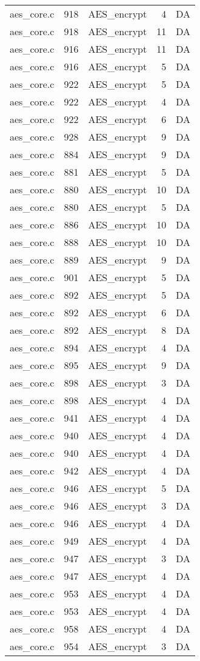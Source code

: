 \begin{table}
\begin{tabular}{clrrr}
aes\_core.c& 918&AES\_encrypt&4 &DA\\
aes\_core.c& 918&AES\_encrypt&11&DA\\
aes\_core.c& 916&AES\_encrypt&11&DA\\
aes\_core.c& 916&AES\_encrypt&5 &DA\\
aes\_core.c& 922&AES\_encrypt&5 &DA\\
aes\_core.c& 922&AES\_encrypt&4 &DA\\
aes\_core.c& 922&AES\_encrypt&6 &DA\\
aes\_core.c& 928&AES\_encrypt&9 &DA\\
aes\_core.c& 884&AES\_encrypt&9 &DA\\
aes\_core.c& 881&AES\_encrypt&5 &DA\\
aes\_core.c& 880&AES\_encrypt&10&DA\\
aes\_core.c& 880&AES\_encrypt&5 &DA\\
aes\_core.c& 886&AES\_encrypt&10&DA\\
aes\_core.c& 888&AES\_encrypt&10&DA\\
aes\_core.c& 889&AES\_encrypt&9 &DA\\
aes\_core.c& 901&AES\_encrypt&5 &DA\\
aes\_core.c& 892&AES\_encrypt&5 &DA\\
aes\_core.c& 892&AES\_encrypt&6 &DA\\
aes\_core.c& 892&AES\_encrypt&8 &DA\\
aes\_core.c& 894&AES\_encrypt&4 &DA\\
aes\_core.c& 895&AES\_encrypt&9 &DA\\
aes\_core.c& 898&AES\_encrypt&3 &DA\\
aes\_core.c& 898&AES\_encrypt&4 &DA\\
aes\_core.c& 941&AES\_encrypt&4 &DA\\
aes\_core.c& 940&AES\_encrypt&4 &DA\\
aes\_core.c& 940&AES\_encrypt&4 &DA\\
aes\_core.c& 942&AES\_encrypt&4 &DA\\
aes\_core.c& 946&AES\_encrypt&5 &DA\\
aes\_core.c& 946&AES\_encrypt&3 &DA\\
aes\_core.c& 946&AES\_encrypt&4 &DA\\
aes\_core.c& 949&AES\_encrypt&4 &DA\\
aes\_core.c& 947&AES\_encrypt&3 &DA\\
aes\_core.c& 947&AES\_encrypt&4 &DA\\
aes\_core.c& 953&AES\_encrypt&4 &DA\\
aes\_core.c& 953&AES\_encrypt&4 &DA\\
aes\_core.c& 958&AES\_encrypt&4 &DA\\
aes\_core.c& 954&AES\_encrypt&3 &DA\\
\hline
\end{tabular}
\end{table}